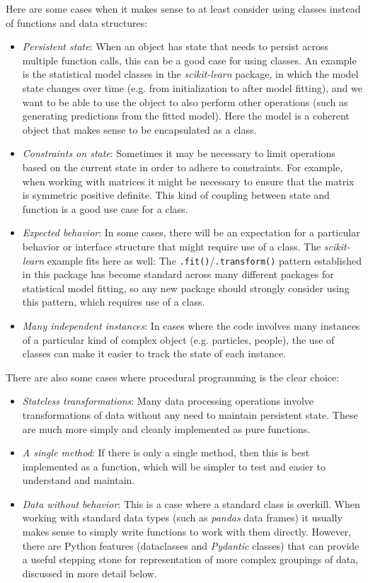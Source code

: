 Here are some cases when it makes sense to at least consider using classes instead of functions and data structures:

\begin{itemize}
\item \textit{Persistent state}: When an object has state that needs to persist across multiple function calls, this can be a good case for using classes. An example is the statistical model classes in the \textit{scikit-learn} package, in which the model state changes over time (e.g. from initialization to after model fitting), and we want to be able to use the object to also perform other operations (such as generating predictions from the fitted model). Here the model is a coherent object that makes sense to be encapsulated as a class.
\item \textit{Constraints on state}: Sometimes it may be necessary to limit operations based on the current state in order to adhere to constraints.  For example, when working with matrices it might be necessary to ensure that the matrix is symmetric positive definite.  This kind of coupling between state and function is a good use case for a class.
\item \textit{Expected behavior}: In some cases, there will be an expectation for a particular behavior or interface structure that might require use of a class.  The \textit{scikit-learn} example fits here as well: The \texttt{.fit()}/\texttt{.transform()} pattern established in this package has become standard across many different packages for statistical model fitting, so any new package should strongly consider using this pattern, which requires use of a class.
\item \textit{Many independent instances}: In cases where the code involves many instances of a particular kind of complex object (e.g. particles, people), the use of classes can make it easier to track the state of each instance.
\end{itemize}

There are also some cases where procedural programming is the clear choice:

\begin{itemize}
\item \textit{Stateless transformations}: Many data processing operations involve transformations of data without any need to maintain persistent state.  These are much more simply and cleanly implemented as pure functions.
\item \textit{A single method}: If there is only a single method, then this is best implemented as a function, which will be simpler to test and easier to understand and maintain.
\item \textit{Data without behavior}: This is a case where a standard class is overkill.  When working with standard data types (such as \textit{pandas} data frames) it usually makes sense to simply write functions to work with them directly.  However, there are Python features (dataclasses and \textit{Pydantic} classes) that can provide a useful stepping stone for representation of more complex groupings of data, discussed in more detail below.
\end{itemize}

